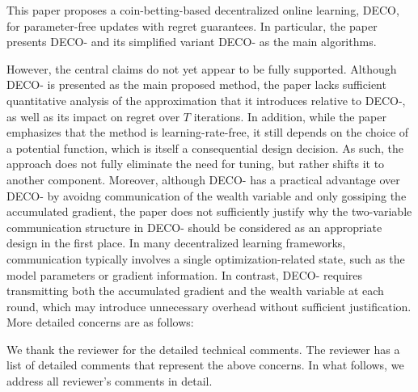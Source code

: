 \documentclass[12pt,english]{reviewresponse}
\newcommand{\algname}{{DECO}\xspace}
\begin{document}
\begin{generalcomment}
    This paper proposes a coin-betting-based decentralized online learning, DECO, for parameter-free updates with regret guarantees. In particular, the paper presents \algname{}- and its simplified variant \algname{}- as the main algorithms.

    However, the central claims do not yet appear to be fully supported. Although \algname{}- is presented as the main proposed method, the paper lacks sufficient quantitative analysis of the approximation that it introduces relative to \algname{}-, as well as its impact on regret over $T$ iterations. In addition, while the paper emphasizes that the method is learning-rate-free, it still depends on the choice of a potential function, which is itself a consequential design decision. As such, the approach does not fully eliminate the need for tuning, but rather shifts it to another component. Moreover, although \algname{}- has a practical advantage over \algname{}- by avoidng communication of the wealth variable and only gossiping the accumulated gradient, the paper does not sufficiently justify why the two-variable communication structure in \algname{}- should be considered as an appropriate design in the first place. In many decentralized learning frameworks, communication typically involves a single optimization-related state, such as the model parameters or gradient information. In contrast, \algname{}- requires transmitting both the accumulated gradient and the wealth variable at each round, which may introduce unnecessary overhead without sufficient justification. More detailed concerns are as follows:
\end{generalcomment}
\begin{revresponse}
    We thank the reviewer for the detailed technical comments.
    The reviewer has a list of detailed comments that represent the above concerns. In what follows, we address all reviewer's comments in detail.
\end{revresponse}
\end{document}
